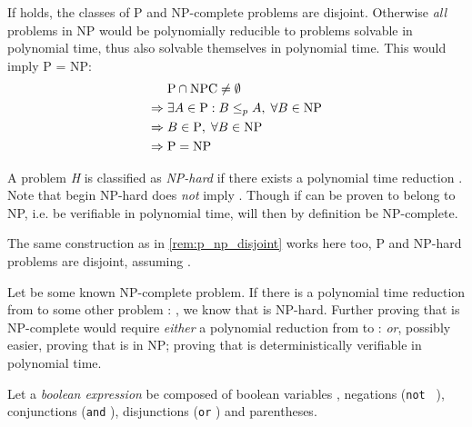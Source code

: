 \begin{remark}\label{rem:p_np_disjoint}
	If \ilmath{\pclass \neq \NP} holds, the classes of P and NP-complete problems are disjoint. Otherwise \emph{all} problems in NP would be polynomially reducible to problems solvable in polynomial time, thus also solvable themselves in polynomial time. This would imply P = NP:
	\begin{align*}
		& \text{P} \cap \text{NPC} \neq \emptyset \\
		\Rightarrow \; & \exists A \in \text{P} : B \leq_p A, \; \forall B \in \text{NP} \\
		\Rightarrow \; & B \in \text{P}, \; \forall B \in \text{NP} \\
		\Rightarrow \; & \text{P} = \text{NP}
	\end{align*}
\end{remark}

\begin{definition}\label{def:np_hard}
	A problem \emph{H} is classified as \emph{NP-hard} if there exists a polynomial time reduction . Note that  begin NP-hard does \emph{not} imply . Though if  can be proven to belong to NP, i.e. be verifiable in polynomial time,  will then by definition be NP-complete.
\end{definition}

\begin{remark}\label{rem:p_np_hard_disjoint}
	The same construction as in \cref{rem:p_np_disjoint} works here too, P and NP-hard problems are disjoint, assuming \ilmath{\pclass \neq \NP}.
\end{remark}

\begin{remark}\label{note:npc_proving}
	Let  be some known NP-complete problem. If there is a polynomial time reduction from  to some other problem : , we know that  is NP-hard. Further proving that  is NP-complete would require \emph{either} a polynomial reduction from  to :  \emph{or}, possibly easier, proving that  is in NP; proving that  is deterministically verifiable in polynomial time.
\end{remark}

Let a \emph{boolean expression} be composed of boolean variables , negations (\texttt{not } \ilmath{\neg}), conjunctions (\texttt{and} \ilmath{\land}), disjunctions (\texttt{or} \ilmath{\lor}) and parentheses.

